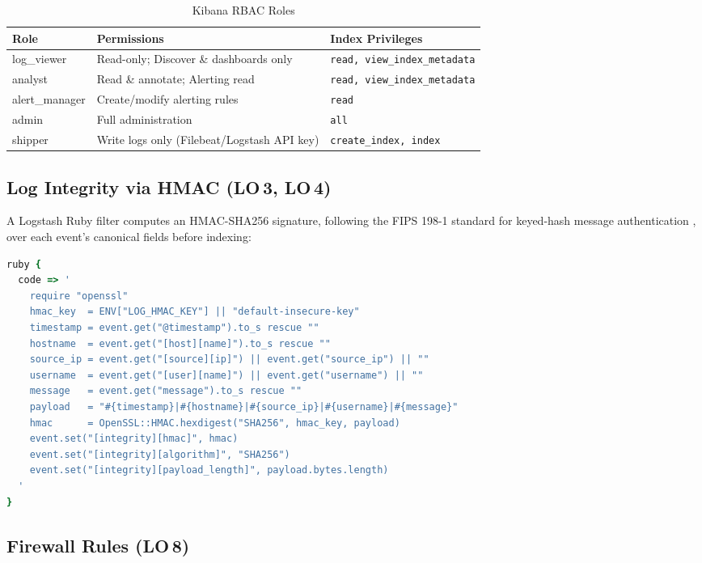 \documentclass[12pt,a4paper]{report}
\begin{document}
\begin{table}[H]
\centering
\caption{Kibana RBAC Roles}
\label{tab:rbac}
\begin{tabularx}{\textwidth}{lXl}
\toprule
\textbf{Role} & \textbf{Permissions} & \textbf{Index Privileges} \\
\midrule
log\_viewer    & Read-only; Discover \& dashboards only  & \texttt{read, view\_index\_metadata} \\
analyst        & Read \& annotate; Alerting read         & \texttt{read, view\_index\_metadata} \\
alert\_manager & Create/modify alerting rules             & \texttt{read} \\
admin          & Full administration                      & \texttt{all} \\
shipper        & Write logs only (Filebeat/Logstash API key) & \texttt{create\_index, index} \\
\bottomrule
\end{tabularx}
\end{table}

\subsection{Log Integrity via HMAC (LO\,3, LO\,4)}

A Logstash Ruby filter computes an HMAC-SHA256 signature, following the FIPS 198-1 standard for keyed-hash message authentication \cite{fips198}, over each event's canonical
fields before indexing:

\begin{lstlisting}[language=ruby, caption={Logstash HMAC integrity filter (from main.conf)}]
ruby {
  code => '
    require "openssl"
    hmac_key  = ENV["LOG_HMAC_KEY"] || "default-insecure-key"
    timestamp = event.get("@timestamp").to_s rescue ""
    hostname  = event.get("[host][name]").to_s rescue ""
    source_ip = event.get("[source][ip]") || event.get("source_ip") || ""
    username  = event.get("[user][name]") || event.get("username") || ""
    message   = event.get("message").to_s rescue ""
    payload   = "#{timestamp}|#{hostname}|#{source_ip}|#{username}|#{message}"
    hmac      = OpenSSL::HMAC.hexdigest("SHA256", hmac_key, payload)
    event.set("[integrity][hmac]", hmac)
    event.set("[integrity][algorithm]", "SHA256")
    event.set("[integrity][payload_length]", payload.bytes.length)
  '
}
\end{lstlisting}

\subsection{Firewall Rules (LO\,8)}
\end{document}
